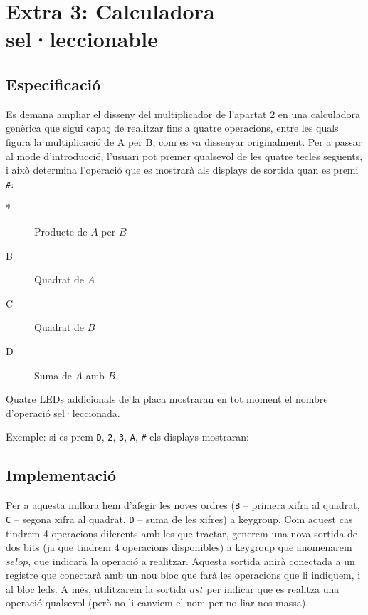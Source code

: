 \chapter{Extra 3: Calculadora sel·leccionable}

\section{Especificació}

Es demana ampliar el disseny del multiplicador de l'apartat 2 en una calculadora genèrica que sigui capaç de realitzar fins a quatre operacions, entre les quals figura la multiplicació de A per B, com es va dissenyar originalment. Per a passar al mode d'introducció, l'usuari pot premer qualsevol de les quatre tecles següents, i això determina l'operació que es mostrarà als displays de sortida quan es premi \texttt{\#}:

\begin{description}
\item[*] Producte de $A$ per $B$
\item[B] Quadrat de $A$
\item[C] Quadrat de $B$
\item[D] Suma de $A$ amb $B$
\end{description}

Quatre LEDs addicionals de la placa mostraran en tot moment el nombre d'operació sel·leccionada.

Exemple: si es prem \texttt{D}, \texttt{2}, \texttt{3}, \texttt{A}, \texttt{\#} els displays mostraran:

\begin{center}
\sevenseg{-}\sevenseg{ }\sevenseg{ }\sevenseg{-}
\end{center}

\section{Implementació}

Per a aquesta millora hem d'afegir les noves ordres (\texttt{B} -- primera xifra al quadrat, \texttt{C} -- segona xifra al quadrat, \texttt{D} --  suma de les xifres) a \textsf{keygroup}. Com aquest cas tindrem 4 operacions diferents amb les que tractar, generem una nova sortida de dos bits (ja que tindrem 4 operacions disponibles) a \textsf{keygroup} que anomenarem $selop$, que indicarà la operació a realitzar. Aquesta sortida anirà conectada a un registre que conectarà amb un nou bloc que farà les operacions que li indiquem, i al bloc \textsf{leds}. A més, utilitzarem la sortida $ast$ per indicar que es realitza una operació qualsevol (però no li canviem el nom per no liar-nos massa).

